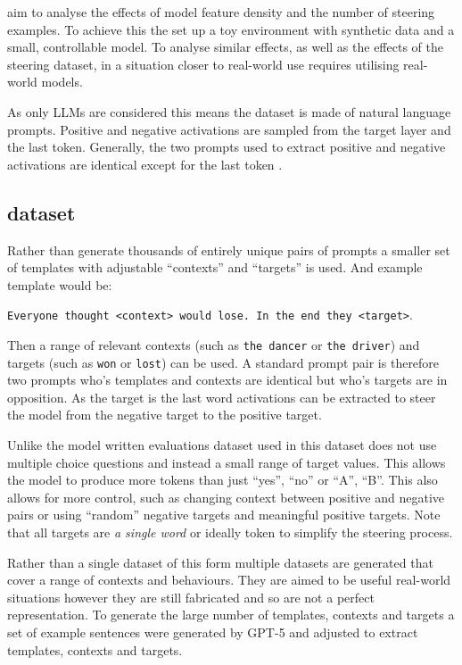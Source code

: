 \citet{steering-clear} aim to analyse the effects of model feature density and the number of steering examples.
To achieve this the set up a toy environment with synthetic data and a small, controllable model.
To analyse similar effects, as well as the effects of the steering dataset, in a situation closer to real-world use requires utilising real-world models.

As only LLMs are considered this means the dataset is made of natural language prompts.
Positive and negative activations are sampled from the target layer and the last token.
Generally, the two prompts used to extract positive and negative activations are identical except for the last token \cite{steerability, icv, activation-addition, rep-engineering}.

\subsection{dataset}

Rather than generate thousands of entirely unique pairs of prompts a smaller set of templates with adjustable ``contexts'' and ``targets'' is used.
And example template would be:

\texttt{Everyone thought <context> would lose. In the end they <target>}.

Then a range of relevant contexts (such as \texttt{the dancer} or \texttt{the driver}) and targets (such as \texttt{won} or \texttt{lost}) can be used.
A standard prompt pair is therefore two prompts who's templates and contexts are identical but who's targets are in opposition.
As the target is the last word activations can be extracted to steer the model from the negative target to the positive target.

Unlike the model written evaluations \cite{mwe} dataset used in \citet{steerability} this dataset does not use multiple choice questions and instead a small range of target values.
This allows the model to produce more tokens than just ``yes'', ``no'' or ``A'', ``B''.
This also allows for more control, such as changing context between positive and negative pairs or using ``random'' negative targets and meaningful positive targets.
Note that all targets are \emph{a single word} or ideally token to simplify the steering process.

Rather than a single dataset of this form multiple datasets are generated that cover a range of contexts and behaviours.
They are aimed to be useful real-world situations however they are still fabricated and so are not a perfect representation.
To generate the large number of templates, contexts and targets a set of example sentences were generated by GPT-5 \cite{gpt-5} and adjusted to extract templates, contexts and targets.


